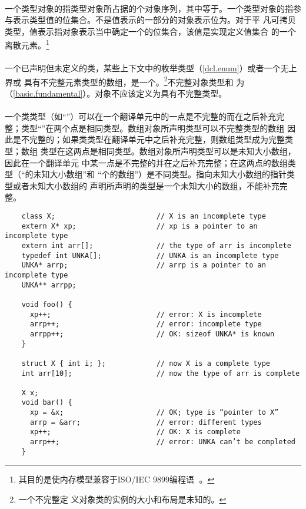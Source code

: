 \paragraph{} %
一个类型对象的指类型对象所占据的个对象序列，其中等于。一个类型对象的指参
与表示类型值的位集合。不是值表示的一部分的对象表示位为。对于平
凡可拷贝类型，值表示指对象表示当中确定一个的位集合，该值是实现定义值集合
的一个离散元素。\footnote{其目的是使\cpp{}内存模型兼容于ISO/IEC 9899编程语言\c{}
。}

\paragraph{} %
一个已声明但未定义的类，某些上下文中的枚举类型（\ref{dcl.enum}）或者一个无上界或
具有不完整元素类型的数组，是一个。\footnote{一个不完整定
义对象类的实例的大小和布局是未知的。}不完整对象类型和 为（\ref{basic.fundamental}）。对象不应该定义为具有不完整类型。

\paragraph{} %
一个类类型（如“”）可以在一个翻译单元中的一点是不完整的而在之后补充完
整；类型“”在两个点是相同类型。数组对象所声明类型可以不完整类型的数组
因此是不完整的；如果类类型在翻译单元中之后补充完整，则数组类型成为完整类型；数组
类型在这两点是相同类型。数组对象所声明类型可以是未知大小数组，因此在一个翻译单元
中某一点是不完整的并在之后补充完整；在这两点的数组类型（“的未知大小数组”和
“个的数组”）是不同类型。指向未知大小数组的指针类型或者未知大小数组的
声明所声明的类型是一个未知大小的数组，不能补充完整。

\begin{example}
  \begin{lstlisting}
    class X;                        // X is an incomplete type
    extern X* xp;                   // xp is a pointer to an incomplete type
    extern int arr[];               // the type of arr is incomplete
    typedef int UNKA[];             // UNKA is an incomplete type
    UNKA* arrp;                     // arrp is a pointer to an incomplete type
    UNKA** arrpp;

    void foo() {
      xp++;                         // error: X is incomplete
      arrp++;                       // error: incomplete type
      arrpp++;                      // OK: sizeof UNKA* is known
    }

    struct X { int i; };            // now X is a complete type
    int arr[10];                    // now the type of arr is complete

    X x;
    void bar() {
      xp = &x;                      // OK; type is “pointer to X”
      arrp = &arr;                  // error: different types
      xp++;                         // OK: X is complete
      arrp++;                       // error: UNKA can’t be completed
    }
  \end{lstlisting}
\end{example}

